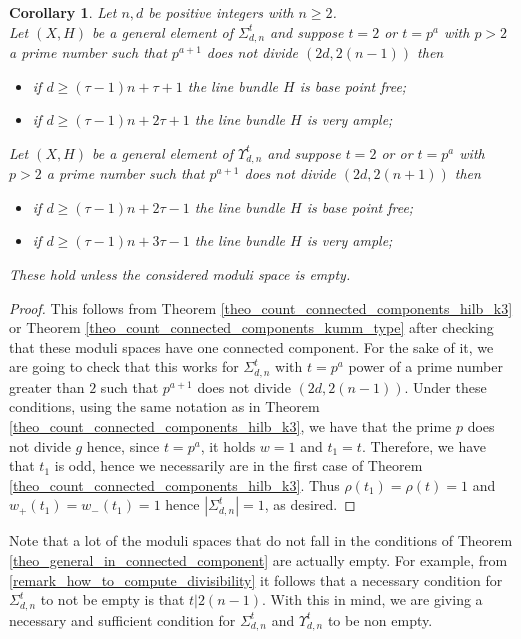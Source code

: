 \documentclass{article}
\newtheorem{corollary}[proposition]{Corollary}
\begin{document}
\begin{corollary}
        Let $n,d$ be positive integers with $n\geq 2$.\\
        Let $(X,H)$ be a general element of $\Sigma_{d,n}^t$ and suppose $t=2$ or $t=p^a$ with $p> 2$ a prime number such that $p^{a+1}$ does not divide $(2d,2(n-1))$ then
    \begin{itemize}
        \item if $d\geq (\tau-1)n+\tau+1$ the line bundle $H$ is base point free;
        \item if $d\geq (\tau-1)n+2\tau+1$ the line bundle $H$ is very ample;
    \end{itemize}
    Let $(X,H)$ be a general element of $\Upsilon_{d,n}^t$ and suppose $t=2$ or or $t=p^a$ with $p> 2$ a prime number such that $p^{a+1}$ does not divide $(2d,2(n+1))$ then
    \begin{itemize}
        \item if $d\geq (\tau-1)n+2\tau-1$ the line bundle $H$ is base point free;
        \item if $d\geq (\tau-1)n+3\tau-1$ the line bundle $H$ is very ample;
    \end{itemize}
These hold unless the considered moduli space is empty.
\end{corollary}

\begin{proof}
    This follows from Theorem \ref{theo_count_connected_components_hilb_k3} or Theorem \ref{theo_count_connected_components_kumm_type} after checking that these moduli spaces have one connected component. For the sake of it, we are going to check that this works for $\Sigma_{d,n}^t$ with $t=p^a$ power of a prime number greater than $2$ such that $p^{a+1}$ does not divide $(2d,2(n-1))$. Under these conditions, using the same notation as in Theorem \ref{theo_count_connected_components_hilb_k3}, we have that the prime $p$ does not divide $g$ hence, since $t=p^a$, it holds $w=1$ and $t_1=t$. Therefore, we have that $t_1$ is odd, hence we necessarily are in the first case of Theorem \ref{theo_count_connected_components_hilb_k3}. Thus $\rho(t_1)=\rho(t)=1$ and $w_+(t_1)=w_-(t_1)=1$ hence $|\Sigma_{d,n}^t|=1$, as desired.
\end{proof}



Note that a lot of the moduli spaces that do not fall in the conditions of Theorem \ref{theo_general_in_connected_component} are actually empty. For example, from \ref{remark_how_to_compute_divisibility} it follows that a necessary condition for $\Sigma_{d,n}^t$ to not be empty is that $t|2(n-1)$. With this in mind, we are giving a necessary and sufficient condition for $\Sigma_{d,n}^t$ and $\Upsilon_{d,n}^t$ to be non empty.
\end{document}
